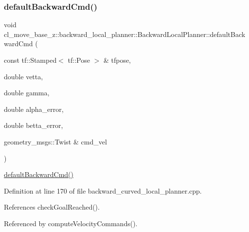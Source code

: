 \mbox{\label{classcl__move__base__z_1_1backward__local__planner_1_1BackwardLocalPlanner_a1ebd69a028a22e3573e98f89d593f97d}} 
\subsubsection{\texorpdfstring{default\+Backward\+Cmd()}{defaultBackwardCmd()}}
{\footnotesize\ttfamily void cl\+\_\+move\+\_\+base\+\_\+z\+::backward\+\_\+local\+\_\+planner\+::\+Backward\+Local\+Planner\+::default\+Backward\+Cmd (\begin{DoxyParamCaption}\item[{const tf\+::\+Stamped$<$ tf\+::\+Pose $>$ \&}]{tfpose,  }\item[{double}]{vetta,  }\item[{double}]{gamma,  }\item[{double}]{alpha\+\_\+error,  }\item[{double}]{betta\+\_\+error,  }\item[{geometry\+\_\+msgs\+::\+Twist \&}]{cmd\+\_\+vel }\end{DoxyParamCaption})\hspace{0.3cm}{\ttfamily [private]}}

\hyperlink{classcl__move__base__z_1_1backward__local__planner_1_1BackwardLocalPlanner_a1ebd69a028a22e3573e98f89d593f97d}{default\+Backward\+Cmd()} 

Definition at line 170 of file backward\+\_\+curved\+\_\+local\+\_\+planner.\+cpp.



References check\+Goal\+Reached().



Referenced by compute\+Velocity\+Commands().


